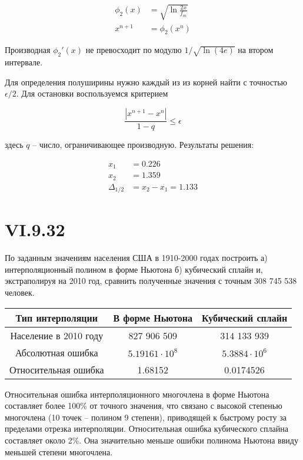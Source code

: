 \documentclass[a4paper,12pt]{article}
\begin{document}
\begin{align*}
    \phi_2 (x) &= \sqrt{\ln \frac{2 x}{f_m}} \\
    x^{n + 1} &= \phi_2 (x^n)
\end{align*}

Производная $\phi_2' (x)$ не превосходит по модулю $1 / \sqrt{\ln (4 e)}$ на втором интервале.

Для определения полуширины нужно каждый из из корней найти с точностью $\epsilon / 2$. Для остановки воспользуемся критерием

\begin{equation*}
    \frac{|x^{n + 1} - x^n|}{1 - q} \leq \epsilon
\end{equation*}

\noindent
здесь $q$ -- число, ограничивающее производную. Результаты решения:

\begin{align*}
    x_1 &= 0.226 \\
    x_2 &= 1.359 \\
    \Delta_{1 / 2} &= x_2 - x_1 = 1.133
\end{align*}

\section*{VI.9.32}

По заданным значениям населения США в 1910-2000 годах построить а) интерполяционный полином в форме Ньютона б) кубический сплайн и, экстраполируя на 2010 год, сравнить полученные значения с точным 308 745 538 человек.

\begin{table*}[htbp]
    \centering
    \begin{tabular}{|c|c|c|}
        \hline
        Тип интерполяции & В форме Ньютона & Кубический сплайн \\
        \hline
        Население в 2010 году & 827 906 509 & 314 133 939 \\
        \hline
        Абсолютная ошибка & $5.19161 \cdot 10^8$ & $5.3884 \cdot 10^6$ \\
        \hline
        Относительная ошибка & 1.68152 & 0.0174526 \\
        \hline
    \end{tabular}
\end{table*}

Относительная ошибка интерполяционного многочлена в форме Ньютона составляет более 100\% от точного значения, что связано с высокой степенью многочлена (10 точек -- полином 9 степени), приводящей к быстрому росту за пределами отрезка интерполяции. Относительная ошибка кубического сплайна составляет около 2\%. Она значительно меньше ошибки полинома Ньютона ввиду меньшей степени многочлена.
\end{document}
